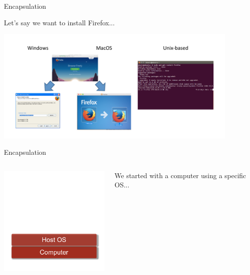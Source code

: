 \begin{frame}{Encapsulation}

Let's say we want to install Firefox...

\includegraphics[width=12cm]{02_encapsulation/figures/install_firefox.pdf}


\end{frame}

\begin{frame}{Encapsulation}
\begin{columns}

\includegraphics[width=6cm]{02_encapsulation/figures/intro_host_49.pdf}

We started with a computer using a specific OS...
\end{columns}
\end{frame}


